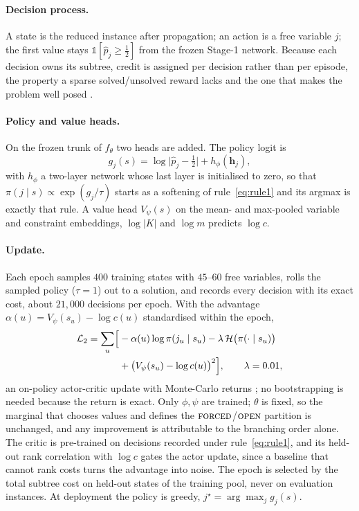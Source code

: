 \documentclass[final,5p,times,twocolumn,authoryear]{elsarticle}
\newcommand{\FORCED}{\textsc{forced}}
\newcommand{\FREE}{\textsc{open}}
\begin{document}
\paragraph{Decision process.} A state is the reduced instance after propagation; an action is a free variable $j$; the first value stays $\mathbb{1}[\hat p_j\ge\frac12]$ from the frozen Stage-1 network. Because each decision owns its subtree, credit is assigned per decision rather than per episode, the property a sparse solved/unsolved reward lacks and the one that makes the problem well posed \citep{etheve2020reinforcement}.

\paragraph{Policy and value heads.} On the frozen trunk of $f_\theta$ two heads are added. The policy logit is
\begin{equation}
g_j(s)=\log\bigl|\hat p_j-\tfrac12\bigr|+h_\phi(\mathbf{h}_j),
\label{eq:policy}
\end{equation}
with $h_\phi$ a two-layer network whose last layer is initialised to zero, so that $\pi(j\mid s)\propto\exp(g_j/\tau)$ starts as a softening of rule~\eqref{eq:rule1} and its argmax is exactly that rule. A value head $V_\psi(s)$ on the mean- and max-pooled variable and constraint embeddings, $\log|K|$ and $\log m$ predicts $\log c$.

\paragraph{Update.} Each epoch samples $400$ training states with $45$--$60$ free variables, rolls the sampled policy ($\tau=1$) out to a solution, and records every decision with its exact cost, about $21{,}000$ decisions per epoch. With the advantage $\alpha(u)=V_\psi(s_u)-\log c(u)$ standardised within the epoch,
\begin{equation}
\begin{split}
\mathcal{L}_2=\sum_u\Bigl[&-\alpha(u)\log\pi(j_u\mid s_u)-\lambda\,\mathcal{H}\bigl(\pi(\cdot\mid s_u)\bigr)\\
&+\bigl(V_\psi(s_u)-\log c(u)\bigr)^2\Bigr],\qquad\lambda=0.01,
\end{split}
\label{eq:loss2}
\end{equation}
an on-policy actor-critic update with Monte-Carlo returns \citep{williams1992simple}; no bootstrapping is needed because the return is exact. Only $\phi,\psi$ are trained; $\theta$ is fixed, so the marginal that chooses values and defines the $\FORCED$/$\FREE$ partition is unchanged, and any improvement is attributable to the branching order alone. The critic is pre-trained on decisions recorded under rule~\eqref{eq:rule1}, and its held-out rank correlation with $\log c$ gates the actor update, since a baseline that cannot rank costs turns the advantage into noise. The epoch is selected by the total subtree cost on held-out states of the training pool, never on evaluation instances. At deployment the policy is greedy, $j^\star=\arg\max_j g_j(s)$.
\end{document}
